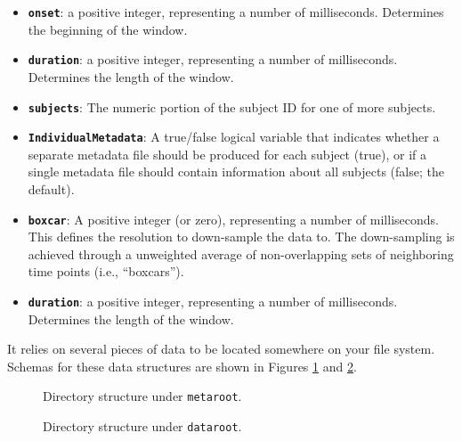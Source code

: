 \documentclass[12pt,a4paper]{article}
\begin{document}
\begin{itemize}
	\item \texttt{\textbf{onset}}: a positive integer, representing a number of milliseconds. Determines the beginning of the window.
	\item \texttt{\textbf{duration}}: a positive integer, representing a number of milliseconds. Determines the length of the window.
	\item \texttt{\textbf{subjects}}: The numeric portion of the subject ID for one of more subjects.
	\item \texttt{\textbf{IndividualMetadata}}: A true/false logical variable that indicates whether a separate metadata file should be produced for each subject (true), or if a single metadata file should contain information about all subjects (false; the default).
	\item \texttt{\textbf{boxcar}}: A positive integer (or zero), representing a number of milliseconds.
	This defines the resolution to down-sample the data to.
	The down-sampling is achieved through a unweighted average of non-overlapping sets of neighboring time points (i.e., ``boxcars'').
	\item \texttt{\textbf{duration}}: a positive integer, representing a number of milliseconds. Determines the length of the window.
\end{itemize}

It relies on several pieces of data to be located somewhere on your file system.
Schemas for these data structures are shown in Figures \ref{fig.metaroot} and \ref{fig.dataroot}.

\begin{figure}

\caption{Directory structure under \texttt{metaroot}.}
\label{fig.metaroot}
\end{figure}

\begin{figure}

\caption{Directory structure under \texttt{dataroot}.}
\label{fig.dataroot}
\end{figure}
\end{document}
